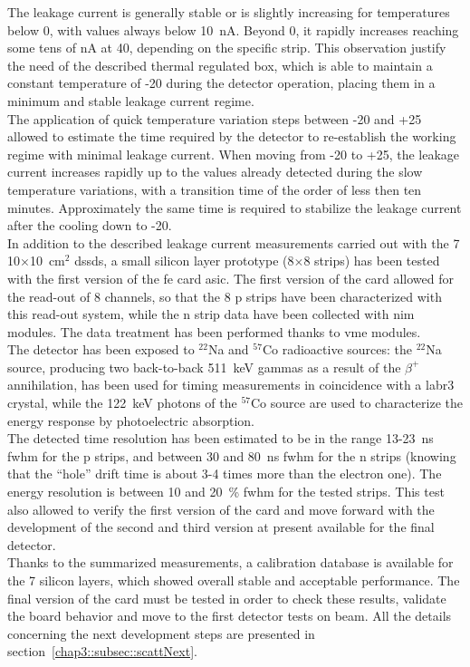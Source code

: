 The leakage current is generally stable or is slightly increasing for temperatures below 0\textdegree{}, with values always below 10~nA. Beyond 0\textdegree{}, it rapidly increases reaching some tens of nA at 40\texdegree{}, depending on the specific strip. This observation justify the need of the described thermal regulated box, which is able to maintain a constant temperature of -20\textdegree{} during the detector operation, placing them in a minimum and stable leakage current regime.\\
The application of quick temperature variation steps between -20\textdegree{} and +25\textdegree{} allowed to estimate the time required by the detector to re-establish the working regime with minimal leakage current. When moving from -20\textdegree{} to +25\textdegree{}, the leakage current increases rapidly up to the values already detected during the slow temperature variations, with a transition time of the order of less then ten minutes. Approximately the same time is required to stabilize the leakage current after the cooling down to -20\textdegree{}.\\
In addition to the described leakage current measurements carried out with the 7 10$\times$10~cm$^{2}$ \glspl{dssd}, a small silicon layer prototype (8$\times$8 strips) has been tested with the first version of the \gls{fe} card \gls{asic}. The first version of the card allowed for the read-out of 8 channels, so that the 8 p strips have been characterized with this read-out system, while the n strip data have been collected with \gls{nim} modules. The data treatment has been performed thanks to \gls{vme} modules.\\
The detector has been exposed to $^{22}$Na and $^{57}$Co radioactive sources: the $^{22}$Na source, producing two back-to-back 511~keV gammas as a result of the $\beta^{+}$ annihilation, has been used for timing measurements in coincidence with a \gls{labr3} crystal, while the 122~keV photons of the $^{57}$Co source are used to characterize the energy response by photoelectric absorption.\\
The detected time resolution has been estimated to be in the range 13-23~ns \gls{fwhm} for the p strips, and between 30 and 80~ns \gls{fwhm} for the n strips (knowing that the \enquote{hole} drift time is about 3-4 times more than the electron one). The energy resolution is between 10 and 20~\% \gls{fwhm} for the tested strips. This test also allowed to verify the first version of the card and move forward with the development of the second and third version at present available for the final detector.\\
Thanks to the summarized measurements, a calibration database is available for the 7 silicon layers, which showed overall stable and acceptable performance. The final version of the card must be tested in order to check these results, validate the board behavior and move to the first detector tests on beam. All the details concerning the next development steps are presented in section~\ref{chap3::subsec::scattNext}.    


